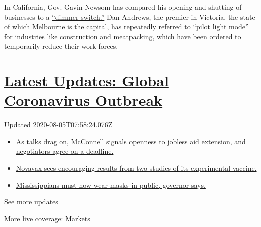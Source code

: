 In California, Gov. Gavin Newsom has compared his opening and shutting
of businesses to a
\href{https://www.nytimes3xbfgragh.onion/2020/06/30/us/coronavirus-california-cases-rising.html}{``dimmer
switch.''} Dan Andrews, the premier in Victoria, the state of which
Melbourne is the capital, has repeatedly referred to ``pilot light
mode'' for industries like construction and meatpacking, which have been
ordered to temporarily reduce their work forces.

\hypertarget{latest-updates-global-coronavirus-outbreak}{%
\section{\texorpdfstring{\href{https://www.nytimes3xbfgragh.onion/2020/08/04/world/coronavirus-cases.html?action=click\&pgtype=Article\&state=default\&region=MAIN_CONTENT_1\&context=storylines_live_updates}{Latest
Updates: Global Coronavirus
Outbreak}}{Latest Updates: Global Coronavirus Outbreak}}\label{latest-updates-global-coronavirus-outbreak}}

Updated 2020-08-05T07:58:24.076Z

\begin{itemize}
\tightlist
\item
  \href{https://www.nytimes3xbfgragh.onion/2020/08/04/world/coronavirus-cases.html?action=click\&pgtype=Article\&state=default\&region=MAIN_CONTENT_1\&context=storylines_live_updates\#link-762df92}{As
  talks drag on, McConnell signals openness to jobless aid extension,
  and negotiators agree on a deadline.}
\item
  \href{https://www.nytimes3xbfgragh.onion/2020/08/04/world/coronavirus-cases.html?action=click\&pgtype=Article\&state=default\&region=MAIN_CONTENT_1\&context=storylines_live_updates\#link-1228a480}{Novavax
  sees encouraging results from two studies of its experimental
  vaccine.}
\item
  \href{https://www.nytimes3xbfgragh.onion/2020/08/04/world/coronavirus-cases.html?action=click\&pgtype=Article\&state=default\&region=MAIN_CONTENT_1\&context=storylines_live_updates\#link-794484ed}{Mississippians
  must now wear masks in public, governor says.}
\end{itemize}

\href{https://www.nytimes3xbfgragh.onion/2020/08/04/world/coronavirus-cases.html?action=click\&pgtype=Article\&state=default\&region=MAIN_CONTENT_1\&context=storylines_live_updates}{See
more updates}

More live coverage:
\href{https://www.nytimes3xbfgragh.onion/live/2020/08/04/business/stock-market-today-coronavirus?action=click\&pgtype=Article\&state=default\&region=MAIN_CONTENT_1\&context=storylines_live_updates}{Markets}

